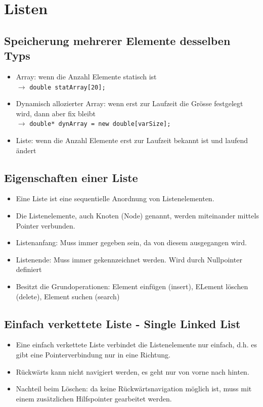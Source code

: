 \section{Listen}
\subsection{Speicherung mehrerer Elemente desselben Typs}
\begin{itemize}
  \item Array: wenn die Anzahl Elemente statisch ist \\ $\rightarrow$  \lstinline{double statArray[20];} 
  \item Dynamisch allozierter Array: wenn erst zur Laufzeit die Grösse festgelegt wird, dann aber fix bleibt \\ $\rightarrow$ 
  \lstinline{double* dynArray = new double[varSize];}
  \item Liste: wenn die Anzahl Elemente erst zur Laufzeit bekannt ist und laufend ändert
\end{itemize}

\subsection{Eigenschaften einer Liste}
\begin{itemize}
  \item Eine Liste ist eine sequentielle Anordnung von Listenelementen.
  \item Die Listenelemente, auch Knoten (Node) genannt, werden miteinander mittels Pointer verbunden.
  \item Listenanfang: Muss immer gegeben sein, da von diesem ausgegangen wird. 
  \item Listenende: Muss immer gekennzeichnet werden. Wird durch Nullpointer definiert
  \item Besitzt die Grundoperationen: Element einfügen (insert), ELement löschen (delete), Element suchen (search)
\end{itemize}

\subsection{Einfach verkettete Liste - Single Linked List}
\begin{itemize}
  \item Eine einfach verkettete Liste verbindet die Listenelemente nur einfach, d.h. es gibt eine Pointerverbindung nur in eine Richtung.
  \item Rückwärts kann nicht navigiert werden, es geht nur von vorne nach hinten.
  \item Nachteil beim Löschen: da keine Rückwärtsnavigation möglich ist, muss mit einem zusätzlichen Hilfspointer gearbeitet werden.
\end{itemize}


